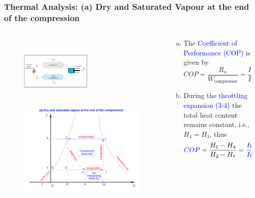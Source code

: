 \documentclass[10pt,compress]{beamer}
\newcommand{\frc}{\displaystyle\frac}
\begin{document}
\begin{frame}
 \frametitle{Thermal Analysis: (a) Dry and Saturated Vapour at the end of the compression}
 \begin{columns}
  \begin{column}[c]{0.35\linewidth}
   \begin{figure}%
     \vbox{
      \includegraphics[width=3.5cm,height=3.5cm,clip]{./Pics/Overview_Refrig12}
      \vspace{-.6cm}
      \includegraphics[width=4.cm,height=4.cm,clip]{./Pics/Overview_Refrig14}}
   \end{figure}  
  \end{column}  
  \begin{column}[c]{0.65\linewidth}
   \begin{enumerate}[(a)]
    \item <1-> The \textcolor{blue}{Coefficient of Performance (COP)} is given by
      \begin{displaymath}
       COP= \frc{R_{n}}{W_{\text{compressor}}}=\frc{H_{1}-H_{4}}{H_{2}-H_{1}}
      \end{displaymath}
    \item <2-> During the \textcolor{blue}{throttling expansion (3-4)} the total heat content remains constant, i.e., $H_{4}=H_{3}$, thus
      \begin{displaymath}
       \textcolor{blue}{COP}= \frc{H_{1}-H_{4}}{H_{2}-H_{1}} = \textcolor{blue}{\frc{H_{1}-H_{3}}{H_{2}-H_{1}}}
      \end{displaymath}
   \end{enumerate}
  \end{column}  
 \end{columns}
\end{frame}
\end{document}
